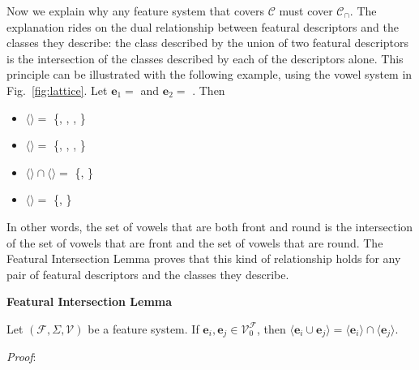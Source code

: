 \documentclass[11pt, oneside]{article}   	%
\begin{document}
Now we explain why any feature system that covers $\mathcal C$ must cover $\mathcal C_\cap$. The explanation rides on the dual relationship between featural descriptors and the classes they describe: the class described by the union of two featural descriptors is the intersection of the classes described by each of the descriptors alone. This principle can be illustrated with the following example, using the vowel system in Fig.~\ref{fig:lattice}. Let $\mathbf{e}_1 =$  and $\mathbf{e}_2 =$ . Then \begin{itemize}
    \item $\langle$$\rangle =$ \{\textipa{\oe}, , , \}
    \item $\langle$$\rangle =$ \{\textipa{\oe}, , , \}
    \item $\langle$$\rangle \cap \langle$$\rangle =$ \{\textipa{\oe}, \}
    \item $\langle$$\rangle =$ \{\textipa{\oe}, \}
    \end{itemize}

In other words, the set of vowels that are both front and round is the intersection of the set of vowels that are front and the set of vowels that are round. The Featural Intersection Lemma proves that this kind of relationship holds for any pair of featural descriptors and the classes they describe.

\vspace{\baselineskip} \noindent \textbf{Featural Intersection Lemma}

Let $(\mathcal F, \Sigma, \mathcal V)$ be a feature system. If $\mathbf{e}_i, \mathbf{e}_j \in \mathcal V_0^\mathcal F$, then $\langle \mathbf{e}_i \cup \mathbf{e}_j \rangle =  \langle \mathbf{e}_i \rangle \cap \langle \mathbf{e}_j \rangle$.

\vspace{\baselineskip} \noindent \textit{Proof}:
\end{document}
